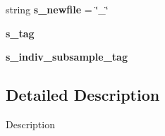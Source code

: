 \begin{DoxyCompactItemize}
\item 
string {\bfseries s\+\_\+newfile} = \char`\"{}\+\_\+\char`\"{}\hypertarget{namespacenegui_1_1genepopfilemanager_a019fe1e59d5fe798b7b252f0f47cd3ee}{}\label{namespacenegui_1_1genepopfilemanager_a019fe1e59d5fe798b7b252f0f47cd3ee}

\item 
{\bfseries s\+\_\+tag}\hypertarget{namespacenegui_1_1genepopfilemanager_a5b170dfc7b13272a8b5179bec6faab70}{}\label{namespacenegui_1_1genepopfilemanager_a5b170dfc7b13272a8b5179bec6faab70}

\item 
{\bfseries s\+\_\+indiv\+\_\+subsample\+\_\+tag}\hypertarget{namespacenegui_1_1genepopfilemanager_a39f923c705bb2590cceb04d46c2023ea}{}\label{namespacenegui_1_1genepopfilemanager_a39f923c705bb2590cceb04d46c2023ea}

\end{DoxyCompactItemize}


\subsection{Detailed Description}
\begin{DoxyVerb}Description
\end{DoxyVerb}
 
